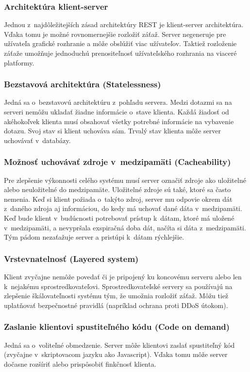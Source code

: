 \documentclass[slovak]{fitthesis}
\begin{document}
\subsubsection{Architektúra klient-server}
Jednou z~najdôležitejších zásad architektúry REST je klient-server architektúra. Vďaka tomu je možné rovnomernejšie rozložiť záťaž. Server negeneruje pre užívateľa grafické rozhranie a môže obslúžiť viac užívateľov. Taktiež rozloženie záťaže umožňuje jednoduchú prenositeľnosť užívateľského rozhrania na viaceré platformy.

\subsubsection{Bezstavová architektúra (Statelessness)}
Jedná sa o~bezstavovú architektúru z~pohľadu servera. Medzi dotazmi sa na serveri nemôžu ukladať žiadne informácie o~stave klienta. Každá žiadosť od akéhokoľvek klienta musí obsahovať všetky potrebné informácie na vybavenie dotazu. Svoj stav si klient uchováva sám. Trvalý stav klienta môže server uchovávať v~databázy.

\subsubsection{Možnosť uchovávať zdroje v~medzipamäti (Cacheability)}
Pre zlepšenie výkonnosti celého systému musí server označiť zdroje ako uložitelné alebo neuložitelné do medzipamäte. Uložitelné zdroje sú také, ktoré sa často nemenia. Keď si klient požiada o~takýto zdroj, server mu odpovie okrem dát z~daného zdroja aj informáciou, do kedy má uchovať dané dáta v~medzipamäti. Keď bude klient v~budúcnosti potrebovať prístup k~dátam, ktoré má uložené v~medzipamäti, a nevypršala exspiračná doba dát, načíta si dáta z~medzipamäti. Tým pádom nezaťažuje server a pristúpi k~dátam rýchlejšie. 

\subsubsection{Vrstevnatelnosť (Layered system)}
Klient zvyčajne nemôže povedať či je pripojený ku koncovému serveru alebo len k~nejakému sprostredkovateľovi. Sprostredkovateľské servery sa používajú na zlepšenie škálovateľnosti systému tým, že umožnia rozložiť záťaž. Môžu tiež uplatňovať bezpečnostné pravidlá (napríklad ochrana proti DDoS útokom).

\subsubsection{Zaslanie klientovi spustiteľného kódu (Code on demand)}
Jedná sa o~voliteľné obmedzenie. Server môže klientovi zaslať spustiteľný kód (zvyčajne v~skriptovacom jazyku ako Javascript). Vďaka tomu môže server dočasne rozšíriť alebo prispôsobiť finkčnosť klienta.
\end{document}
